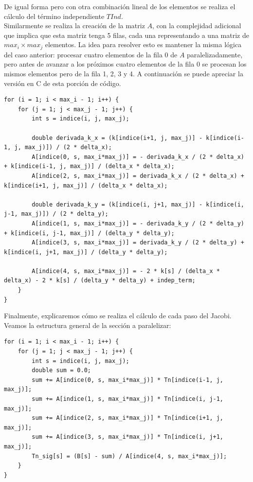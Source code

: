 \documentclass[a4paper]{article}
\begin{document}
De igual forma pero con otra combinación lineal de los elementos 
se realiza el cálculo del término independiente $TInd$. \\ 

Similarmente se realiza la creación de la matriz $A$, con la complejidad
adicional que implica que esta matriz tenga 5 filas, cada una representando
a una matriz de $max_i \times max_j$ elementos. La idea para resolver esto
es mantener la misma lógica del caso anterior: procesar cuatro elementos 
de la fila 0 de $A$ paralelizadamente, pero antes de avanzar a los próximos
cuatro elementos de la fila 0 se procesan los mismos elementos pero de la
fila 1, 2, 3 y 4. A continuación se puede apreciar la versión en C de esta
porción de código. \\

\begin{lstlisting}[caption = {Sección de la versión en C de la creación de la matriz $A$}]
for (i = 1; i < max_i - 1; i++) {
	for (j = 1; j < max_j - 1; j++) {
		int s = indice(i, j, max_j);
		
		double derivada_k_x = (k[indice(i+1, j, max_j)] - k[indice(i-1, j, max_j)]) / (2 * delta_x);
		A[indice(0, s, max_i*max_j)] = - derivada_k_x / (2 * delta_x) + k[indice(i-1, j, max_j)] / (delta_x * delta_x);
		A[indice(2, s, max_i*max_j)] = derivada_k_x / (2 * delta_x) + k[indice(i+1, j, max_j)] / (delta_x * delta_x);

		double derivada_k_y = (k[indice(i, j+1, max_j)] - k[indice(i, j-1, max_j)]) / (2 * delta_y);
		A[indice(1, s, max_i*max_j)] = - derivada_k_y / (2 * delta_y) + k[indice(i, j-1, max_j)] / (delta_y * delta_y);
		A[indice(3, s, max_i*max_j)] = derivada_k_y / (2 * delta_y) + k[indice(i, j+1, max_j)] / (delta_y * delta_y);

		A[indice(4, s, max_i*max_j)] = - 2 * k[s] / (delta_x * delta_x) - 2 * k[s] / (delta_y * delta_y) + indep_term;
	}
}
\end{lstlisting}

Finalmente, explicaremos cómo se realiza el cálculo de cada paso del
Jacobi. Veamos la estructura general de la sección a paralelizar:

\begin{lstlisting}[caption = {Sección de la versión en C del cálculo de un paso de Jacobi}]
for (i = 1; i < max_i - 1; i++) {
	for (j = 1; j < max_j - 1; j++) {
		int s = indice(i, j, max_j);
		double sum = 0.0;
		sum += A[indice(0, s, max_i*max_j)] * Tn[indice(i-1, j, max_j)];
		sum += A[indice(1, s, max_i*max_j)] * Tn[indice(i, j-1, max_j)];
		sum += A[indice(2, s, max_i*max_j)] * Tn[indice(i+1, j, max_j)];
		sum += A[indice(3, s, max_i*max_j)] * Tn[indice(i, j+1, max_j)];
		Tn_sig[s] = (B[s] - sum) / A[indice(4, s, max_i*max_j)];
	}
}
\end{lstlisting}
\end{document}
